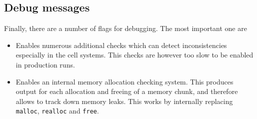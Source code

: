 \subsection{Debug messages}
Finally, there are a number of flags for debugging. The most important one are
\begin{itemize}
\item {} Enables numerous additional checks which can detect
  inconsistencies especially in the cell systems. This checks are however too slow to be enabled in
  production runs.
\item {} Enables an internal memory allocation checking system. This produces
  output for each allocation and freeing of a memory chunk, and therefore allows to track down
  memory leaks. This works by internally replacing \texttt{malloc}, \texttt{realloc} and
  \texttt{free}.
\end{itemize}

